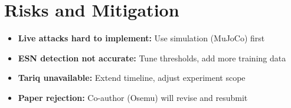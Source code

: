 \documentclass[conference]{IEEEtran}
\begin{document}
\section{Risks and Mitigation}

\begin{itemize}
    \item \textbf{Live attacks hard to implement:} Use simulation (MuJoCo) first
    \item \textbf{ESN detection not accurate:} Tune thresholds, add more training data
    \item \textbf{Tariq unavailable:} Extend timeline, adjust experiment scope
    \item \textbf{Paper rejection:} Co-author (Osemu) will revise and resubmit
\end{itemize}

\balance
\end{document}
